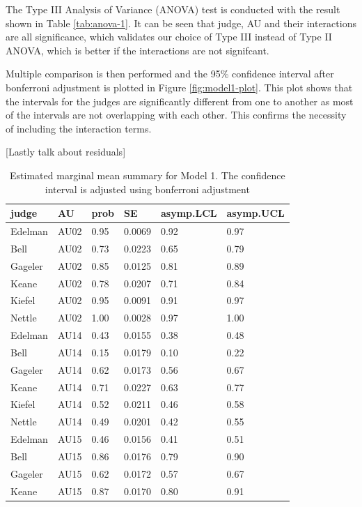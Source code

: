 \documentclass{monashthesis}
\begin{document}
The Type III Analysis of Variance (ANOVA) test is conducted with the result shown in Table \ref{tab:anova-1}. It can be seen that judge, AU and their interactions are all significance, which validates our choice of Type III instead of Type II ANOVA, which is better if the interactions are not signifcant.

Multiple comparison is then performed and the 95\% confidence interval after bonferroni adjustment is plotted in Figure \ref{fig:model1-plot}. This plot shows that the intervals for the judges are significantly different from one to another as most of the intervals are not overlapping with each other. This confirms the necessity of including the interaction terms.

{[}Lastly talk about residuals{]}

\begin{table}[ht]
\begin{center}
\caption{\label{tab:result_1}Estimated marginal mean summary for Model 1. The confidence interval is adjusted using bonferroni adjustment}
\begin{tabular}{llllll}
\toprule
judge & AU & prob & SE & asymp.LCL & asymp.UCL \\
\midrule
Edelman & AU02 & 0.95 & 0.0069 & 0.92 & 0.97 \\
Bell & AU02 & 0.73 & 0.0223 & 0.65 & 0.79 \\
Gageler & AU02 & 0.85 & 0.0125 & 0.81 & 0.89 \\
Keane & AU02 & 0.78 & 0.0207 & 0.71 & 0.84 \\
Kiefel & AU02 & 0.95 & 0.0091 & 0.91 & 0.97 \\
Nettle & AU02 & 1.00 & 0.0028 & 0.97 & 1.00 \\
Edelman & AU14 & 0.43 & 0.0155 & 0.38 & 0.48 \\
Bell & AU14 & 0.15 & 0.0179 & 0.10 & 0.22 \\
Gageler & AU14 & 0.62 & 0.0173 & 0.56 & 0.67 \\
Keane & AU14 & 0.71 & 0.0227 & 0.63 & 0.77 \\
Kiefel & AU14 & 0.52 & 0.0211 & 0.46 & 0.58 \\
Nettle & AU14 & 0.49 & 0.0201 & 0.42 & 0.55 \\
Edelman & AU15 & 0.46 & 0.0156 & 0.41 & 0.51 \\
Bell & AU15 & 0.86 & 0.0176 & 0.79 & 0.90 \\
Gageler & AU15 & 0.62 & 0.0172 & 0.57 & 0.67 \\
Keane & AU15 & 0.87 & 0.0170 & 0.80 & 0.91 \\

\end{tabular}
\end{center}
\end{table}
\end{document}
